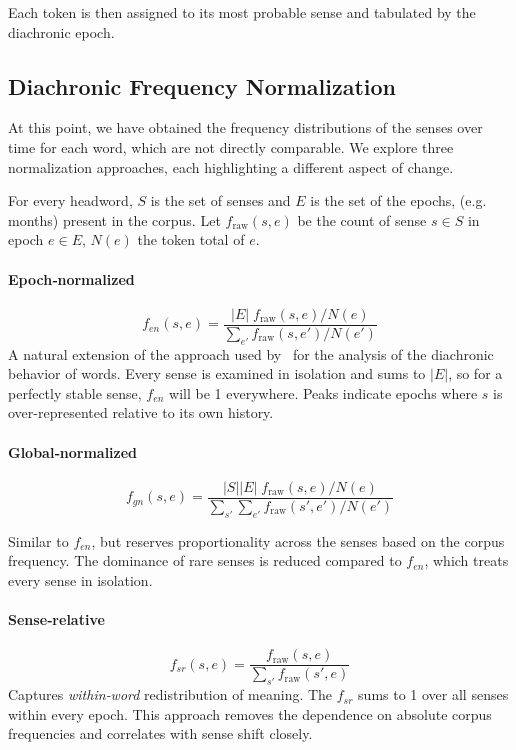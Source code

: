 \documentclass[11pt]{article}
\begin{document}
Each token is then assigned to its most probable sense and tabulated by the diachronic epoch.

\subsection{Diachronic Frequency Normalization}
\label{sec:freq}
At this point, we have obtained the frequency distributions of the senses over time for each word, which are not directly comparable. We explore three normalization approaches, each highlighting
a different aspect of change.

For every headword, $S$ is the set of senses and $E$ is the set of the epochs, (e.g. months) present in the corpus. Let $f_{\text{raw}}(s,e)$ be the count of sense $s \in S$
in epoch $e \in E$, $N(e)$ the token total of $e$.

\paragraph{Epoch‑normalized}  
      \[
        f_{en}(s,e)=\frac{|E|\;f_{\text{raw}}(s,e)/N(e)}
                         {\sum_{e'}f_{\text{raw}}(s,e')/N(e')}
      \]
      A natural extension of the approach used by~\citet{trendy} for the analysis of the diachronic behavior of words. Every sense is examined in isolation and sums to $|E|$, so for a perfectly stable sense, $f_{en}$ will be 1 everywhere. Peaks indicate epochs where $s$ is over-represented relative to its own history.

\paragraph{Global‑normalized}  
      \[
        f_{gn}(s,e)=\frac{|S||E|\;f_{\text{raw}}(s,e)/N(e)}
                         {\sum_{s'}\sum_{e'}f_{\text{raw}}(s',e')/N(e')}
      \]
      
      Similar to $f_{en}$, but reserves proportionality across the senses based on the corpus frequency. The dominance of rare senses is reduced compared to $f_{en}$, which treats every sense in isolation.

\paragraph{Sense‑relative}
      \[
        f_{sr}(s,e)=\frac{f_{\text{raw}}(s,e)}
                         {\sum_{s'}f_{\text{raw}}(s',e)}
      \]
      Captures \emph{within‑word} redistribution of meaning. The $f_{sr}$ sums to 1 over all senses within every epoch. This approach removes the dependence on absolute corpus frequencies and correlates with sense shift closely.
\end{document}

